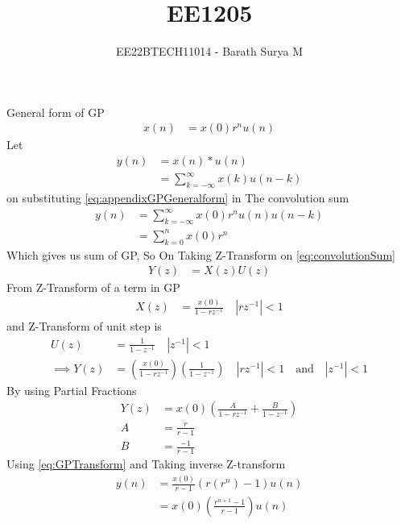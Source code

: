 \documentclass[journal,12pt,onecolumn]{IEEEtran}
\theoremstyle{remark}
\providecommand{\brak}[1]{\ensuremath{\left(#1\right)}}
\providecommand{\abs}[1]{\left\vert#1\right\vert}
\begin{document}

\vspace{3cm}

\title{EE1205}
\author{EE22BTECH11014 - Barath Surya M}
\maketitle
General form of GP
\begin{align}
	x\brak{n}&=x\brak{0}r^n u\brak{n} \label{eq:appendixGPGeneralform}
\end{align}
Let 
\begin{align}
	y\brak{n} &=x\brak{n} * u\brak{n} \label{eq:convolutionSum}\\
	&=\sum _{k=-\infty}^{\infty} x\brak{k} u\brak{n-k}
\end{align}
on substituting \eqref{eq:appendixGPGeneralform} in The convolution sum 
\begin{align}
	y\brak{n} &= \sum_{k=-\infty}^{\infty} x\brak{0}r^n u\brak{n} u\brak{n-k}\\
	&= \sum _{k=0}^{n} x\brak{0} r^n
\end{align}
Which gives us sum of GP, So On Taking Z-Transform on \eqref{eq:convolutionSum}
\begin{align}
	Y\brak{z}&= X\brak{z} U\brak{z}
\end{align}
From Z-Transform of a term in GP 
\begin{align}
	X\brak{z}&=	\frac{x\brak{0}}{1-rz^{-1}}  \label{eq:GPTransform} \quad \abs{rz^{-1}}<1
\end{align}
and Z-Transform of unit step is 
\begin{align}
	U\brak{z} &=\frac{1}{1-z^{-1}}  \quad \abs{z^{-1}}<1\\
	\implies Y\brak{z}&=\brak{\frac{x\brak{0}}{1-rz^{-1}}}\brak{\frac{1}{1-z^{-1}}} \quad \abs{rz^{-1}}<1 \quad \text{and}  \quad \abs{z^{-1}}<1
\end{align}
By using Partial Fractions
\begin{align}
	Y\brak{z}&=x\brak{0}\brak{\frac{A}{1-rz^{-1}} + \frac{B}{1-z^{-1}}}\\
	A&=\frac{r}{r-1}\\
	B&= \frac{-1}{r-1}
\end{align}
Using \eqref{eq:GPTransform} and Taking inverse Z-transform 
\begin{align}
	y\brak{n}&=\frac{x\brak{0}}{r-1}\brak{r\brak{r^n}-1}u\brak{n}\\
	&=x\brak{0}\brak{\frac{r^{n+1}-1}{r-1}}u\brak{n}
\end{align}
\end{document}
